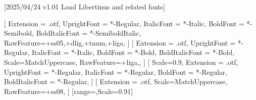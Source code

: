 
[2025/04/24 v1.01 Load Libertinus and related fonts]

%
%
\ifpdftex
    \RequirePackage[T1]{fontenc}
    \RequirePackage[lf,t,semibold,ScaleTT=0.9]{libertinus} %
    \RequirePackage{bm}%
\else
    \RequirePackage[warnings-off={mathtools-colon,mathtools-overbracket}]{unicode-math}
    \setmainfont{LibertinusSerif}[%
    	Extension = .otf,
    	UprightFont = *-Regular,
    	ItalicFont = *-Italic,
    	BoldFont = *-Semibold, 
    	BoldItalicFont = *-SemiboldItalic,
    	RawFeature={+ss05,+dlig,+tnum,+liga}, 
    ]    
    \setsansfont{LibertinusSans}[%
    	Extension = .otf,
    	UprightFont = *-Regular,
    	ItalicFont = *-Italic,
    	BoldFont = *-Bold,
	    BoldItalicFont = *-Bold,%
    	Scale=MatchUppercase,
		RawFeature={+liga,},
	]
    \setmonofont{LibertinusMono}[%
    	Scale=0.9,%
	    Extension = .otf,
    	UprightFont = *-Regular,
    	ItalicFont = *-Regular,%
    	BoldFont = *-Regular,%
	    BoldItalicFont = *-Regular,%
	] 
	\newfontfamily{}%
	\newfontfamily{}%
    [%
     	Extension = .otf,   
    	Scale=MatchUppercase,
    	RawFeature={+ss08},%
    	]
	[range=\nabla,Scale=0.91] %
	
    \newcommand*{\FRAC}[1]{{\addfontfeature{Fractions=On}#1}}%
\fi
